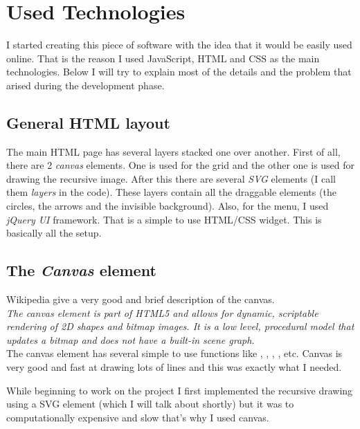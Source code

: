 \section{Used Technologies}
        I started creating this piece of software with the idea that it would be easily used online. That is the reason I used JavaScript, HTML and CSS as the main technologies. Below I will try to explain most of the details and the problem that arised during the development phase.

        \subsection{General HTML layout}

            The main HTML page has several layers stacked one over another. First of all, there are 2 \emph{canvas} elements. One is used for the grid and the other one is used for drawing the recursive image. After this there are several \emph{SVG} elements (I call them \emph{layers} in the code). These layers contain all the draggable elements (the circles, the arrows and the invisible background). Also, for the menu, I used \emph{jQuery UI} framework. That is a simple to use HTML/CSS widget. This is basically all the setup.

        \subsection{The \emph{Canvas} element}
            Wikipedia \cite{wiki_canvas} give a very good and brief description of the canvas. \\
            \emph{The canvas element is part of HTML5 and allows for dynamic, scriptable rendering of 2D shapes and bitmap images. It is a low level, procedural model that updates a bitmap and does not have a built-in scene graph}. \\

            The canvas element has several simple to use functions like , , , , etc. Canvas is very good and fast at drawing lots of lines and this was exactly what I needed.

            While beginning to work on the project I first implemented the recursive drawing using a SVG element (which I will talk about shortly) but it was to computationally expensive and slow that's why I used canvas.

